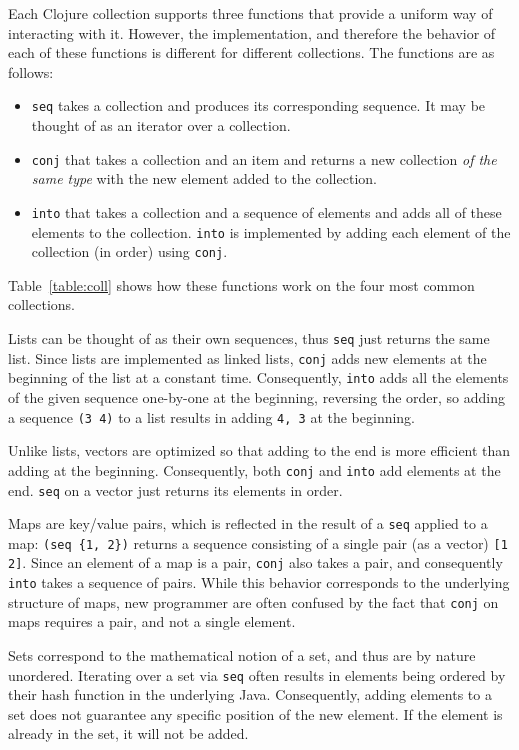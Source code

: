 \documentclass[submission,copyright,creativecommons]{eptcs}
\newcommand{\clocode}[1]{{\tt {#1}}}
\begin{document}
Each Clojure collection supports three functions that provide a uniform way of interacting with it. However, the implementation, and therefore the behavior of each of these functions is different for different collections. The functions are as follows:
\begin{itemize}
\item \clocode{seq} takes a collection and produces its corresponding sequence. It may be thought of as an iterator over a collection.  
\item \clocode{conj} that takes a collection and an item and returns a new collection {\it of the same type} with the new element added to the collection. 
\item \clocode{into} that takes a collection and a sequence of elements and adds all of these elements to the collection. \clocode{into} is implemented by adding each element of the collection (in order) using \clocode{conj}. 
\end{itemize}
Table~\ref{table:coll} shows how these functions work on the four most common collections. 

Lists can be thought of as their own sequences, thus \clocode{seq} just returns the same list. 
Since lists are implemented as linked lists, \clocode{conj} adds new elements at the beginning of the list at a constant time. Consequently, \clocode{into} adds all the elements of the given sequence one-by-one at the beginning, reversing the order, so adding a sequence \clocode{(3 4)} to a list results in adding \clocode{4, 3} at the beginning. 

Unlike lists, vectors are optimized so that adding to the end is more efficient than adding at the beginning. Consequently, both  \clocode{conj} and \clocode{into} add elements at the end. \clocode{seq} on a vector just returns its elements in order. 

Maps are key/value pairs, which is reflected in the result of a \clocode{seq} applied to a map: \clocode{(seq \{1, 2\})} returns a sequence consisting of a single pair (as a vector) \clocode{[1 2]}. Since an element of a map is a pair, \clocode{conj} also takes a pair, and consequently \clocode{into} takes a sequence of pairs. While this behavior corresponds to the underlying structure of maps, new programmer are often confused by the fact that \clocode{conj} on maps requires a pair, and not a single element. 

Sets correspond to the mathematical notion of a set, and thus are by nature unordered. Iterating over a set via \clocode{seq} often results in elements being ordered by their hash function in the underlying Java. Consequently, adding elements to a set does not guarantee any specific position of the new element. If the element is already in the set, it will not be added. 
\end{document}
